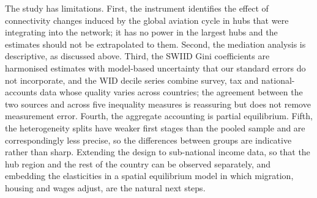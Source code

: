The study has limitations. First, the instrument identifies the effect of connectivity changes induced by the global aviation cycle in hubs that were integrating into the network; it has no power in the largest hubs and the estimates should not be extrapolated to them. Second, the mediation analysis is descriptive, as discussed above. Third, the SWIID Gini coefficients are harmonised estimates with model-based uncertainty that our standard errors do not incorporate, and the WID decile series combine survey, tax and national-accounts data whose quality varies across countries; the agreement between the two sources and across five inequality measures is reassuring but does not remove measurement error. Fourth, the aggregate accounting is partial equilibrium. Fifth, the heterogeneity splits have weaker first stages than the pooled sample and are correspondingly less precise, so the differences between groups are indicative rather than sharp. Extending the design to sub-national income data, so that the hub region and the rest of the country can be observed separately, and embedding the elasticities in a spatial equilibrium model in which migration, housing and wages adjust, are the natural next steps.

